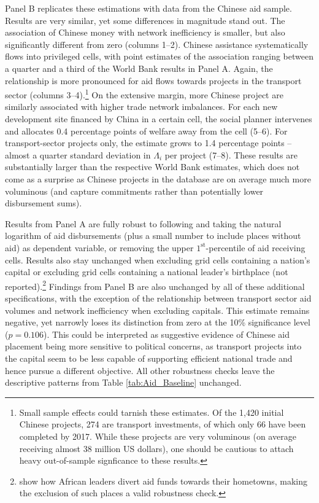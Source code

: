 \documentclass[11pt, oneside]{article}   	%
\begin{document}
Panel B replicates these estimations with data from the Chinese aid sample. Results are very similar, yet some differences in magnitude stand out. The association of Chinese money with network inefficiency is smaller, but also significantly different from zero (columns 1--2). Chinese assistance systematically flows into privileged cells, with point estimates of the association ranging between a quarter and a third of the World Bank results in Panel A. Again, the relationship is more pronounced for aid flows towards projects in the transport sector (columns 3--4).\footnote{Small sample effects could tarnish these estimates. Of the 1,420 initial Chinese projects, 274 are transport investments, of which only 66 have been completed by 2017. While these projects are very voluminous (on average receiving almost 38 million US dollars), one should be cautious to attach heavy out-of-sample signficance to these results.} On the extensive margin, more Chinese project are similarly associated with higher trade network imbalances. For each new development site financed by China in a certain cell, the social planner intervenes and allocates 0.4 percentage points of welfare away from the cell (5--6). For transport-sector projects only, the estimate grows to 1.4 percentage points -- almost a quarter standard deviation in $\Lambda_{i}$ per project (7--8). These results are substantially larger than the respective World Bank estimates, which does not come as a surprise as Chinese projects in the database are on average much more voluminous (and capture commitments rather than potentially lower disbursement sums).

Results from Panel A are fully robust to following \cite{Dreher_Aidgrowthregional_2015} and taking the natural logarithm of aid disbursements (plus a small number to include places without aid) as dependent variable, or removing the upper $1^{\textrm{st}}$-percentile of aid receiving cells. Results also stay unchanged when excluding grid cells containing a nation's capital or excluding grid cells containing a national leader's birthplace (not reported).\footnote{\cite{Dreher_AiddemandAfrican_2016} show how African leaders divert aid funds towards their hometowns, making the exclusion of such places a valid robustness check.} Findings from Panel B are also unchanged by all of these additional specifications, with the exception of the relationship between transport sector aid volumes and network inefficiency when excluding capitals. This estimate remains negative, yet narrowly loses its distinction from zero at the 10\% significance level ($p = 0.106$). This could be interpreted as suggestive evidence of Chinese aid placement being more sensitive to political concerns, as transport projects into the capital seem to be less capable of supporting efficient national trade and hence pursue a different objective. All other robustness checks leave the descriptive patterns from Table \eqref{tab:Aid_Baseline} unchanged.
\end{document}
